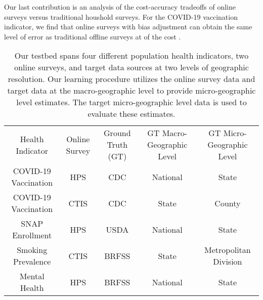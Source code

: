 Our last contribution is an analysis of the cost-accuracy tradeoffs of online surveys versus traditional houshold surveys. For the COVID-19 vaccination indicator, we find that online surveys with bias adjustment can obtain the same level of error as traditional offline surveys at  of the cost .



	\begin{table}[ht]
    \centering
    \renewcommand{\arraystretch}{1.5} %
    \setlength{\tabcolsep}{6pt} %
    \begin{tabular}{|c|c|c|c|c|}
        \hline
        \multirow{3}{5em}{Health Indicator} & \multirow{3}{5em}{Online Survey} & \multirow{3}{5em}{Ground Truth (GT)} & \multirow{3}{5em}{GT Macro-Geographic Level} & \multirow{3}{5em}{GT Micro-Geographic Level}\\
        & & & &  \\
        & & & &  \\
        \hline 
        COVID-19 Vaccination & HPS  & CDC    & National & State  \\
        COVID-19 Vaccination & CTIS & CDC    & State    & County \\
        SNAP Enrollment      & HPS  & USDA   & National & State  \\
        Smoking Prevalence   & CTIS & BRFSS  & State    & Metropolitan Division \\
        Mental Health        & HPS  & BRFSS  & National & State \\ 
        \hline
    \end{tabular}
    \caption{Our testbed spans four different population health indicators, two online surveys, and target data sources at two levels of geographic resolution. Our learning procedure utilizes the online survey data and target data at the macro-geographic level to provide micro-geographic level estimates. The target micro-geographic level data is used to evaluate these estimates.}
    \label{tab:data_pairing}
\end{table}


